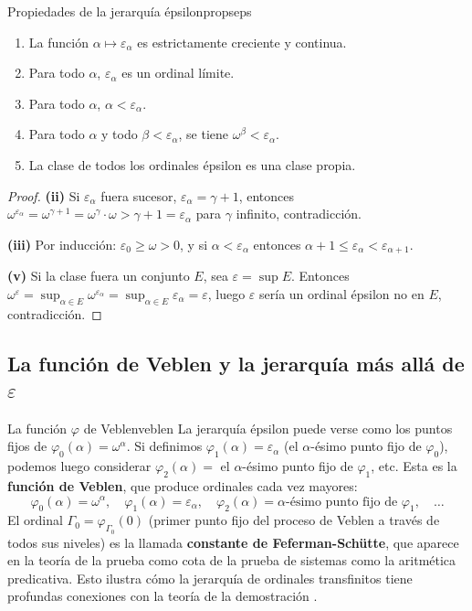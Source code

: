 \begin{proposicion}{Propiedades de la jerarquía épsilon}{propseps}
\begin{enumerate}[leftmargin=2em, label=(\roman*)]
  \item La función $\alpha \mapsto \varepsilon_\alpha$ es estrictamente creciente y continua.
  \item Para todo $\alpha$, $\varepsilon_\alpha$ es un ordinal límite.
  \item Para todo $\alpha$, $\alpha < \varepsilon_\alpha$.
  \item Para todo $\alpha$ y todo $\beta < \varepsilon_\alpha$, se tiene $\omega^\beta < \varepsilon_\alpha$.
  \item La clase de todos los ordinales épsilon es una clase propia.
\end{enumerate}
\end{proposicion}

\begin{proof}
\textbf{(ii)} Si $\varepsilon_\alpha$ fuera sucesor, $\varepsilon_\alpha = \gamma + 1$, entonces $\omega^{\varepsilon_\alpha} = \omega^{\gamma+1} = \omega^\gamma \cdot \omega > \gamma + 1 = \varepsilon_\alpha$ para $\gamma$ infinito, contradicción.

\textbf{(iii)} Por inducción: $\varepsilon_0 \geq \omega > 0$, y si $\alpha < \varepsilon_\alpha$ entonces $\alpha + 1 \leq \varepsilon_\alpha < \varepsilon_{\alpha+1}$.

\textbf{(v)} Si la clase fuera un conjunto $E$, sea $\varepsilon = \sup E$. Entonces $\omega^\varepsilon = \sup_{\alpha \in E} \omega^{\varepsilon_\alpha} = \sup_{\alpha \in E} \varepsilon_\alpha = \varepsilon$, luego $\varepsilon$ sería un ordinal épsilon no en $E$, contradicción.
\end{proof}

\subsection{La función de Veblen y la jerarquía más allá de $\varepsilon$}

\begin{observacion}{La función $\varphi$ de Veblen}{veblen}
La jerarquía épsilon puede verse como los puntos fijos de $\varphi_0(\alpha) = \omega^\alpha$. Si definimos $\varphi_1(\alpha) = \varepsilon_\alpha$ (el $\alpha$-ésimo punto fijo de $\varphi_0$), podemos luego considerar $\varphi_2(\alpha) = $ el $\alpha$-ésimo punto fijo de $\varphi_1$, etc. Esta es la \textbf{función de Veblen}, que produce ordinales cada vez mayores:
\[
  \varphi_0(\alpha) = \omega^\alpha, \quad
  \varphi_1(\alpha) = \varepsilon_\alpha, \quad
  \varphi_2(\alpha) = \text{$\alpha$-ésimo punto fijo de $\varphi_1$}, \quad \ldots
\]
El ordinal $\Gamma_0 = \varphi_{\Gamma_0}(0)$ (primer punto fijo del proceso de Veblen a través de todos sus niveles) es la llamada \textbf{constante de Feferman-Schütte}, que aparece en la teoría de la prueba como cota de la prueba de sistemas como la aritmética predicativa. Esto ilustra cómo la jerarquía de ordinales transfinitos tiene profundas conexiones con la teoría de la demostración \cite{pohlers1989, smorynski1991}.
\end{observacion}

